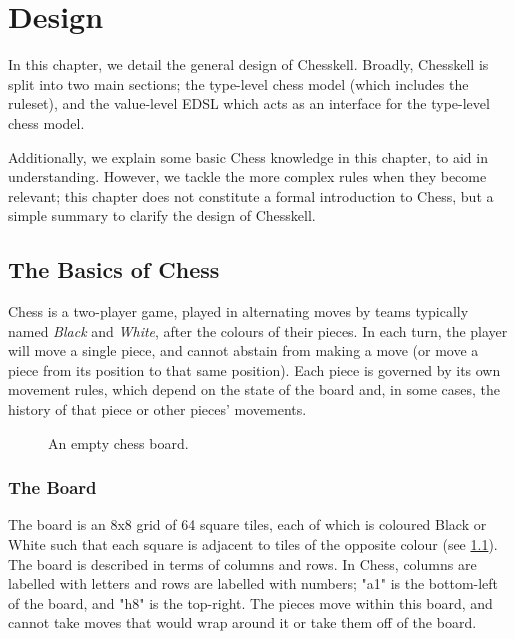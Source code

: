 \chapter{Design}

In this chapter, we detail the general design of Chesskell. Broadly, Chesskell is split into two main sections; the type-level chess model (which includes the ruleset), and the value-level EDSL which acts as an interface for the type-level chess model.

Additionally, we explain some basic Chess knowledge in this chapter, to aid in understanding. However, we tackle the more complex rules when they become relevant; this chapter does not constitute a formal introduction to Chess, but a simple summary to clarify the design of Chesskell.

\section{The Basics of Chess}

Chess is a two-player game, played in alternating moves by teams typically named \emph{Black} and \emph{White}, after the colours of their pieces. In each turn, the player will move a single piece, and cannot abstain from making a move (or move a piece from its position to that same position). Each piece is governed by its own movement rules, which depend on the state of the board and, in some cases, the history of that piece or other pieces' movements.

\begin{figure}[h]
    \centering
    \showboard
    \caption{An empty chess board.}
    \label{chessboard}
\end{figure}

\subsection{The Board} \label{boarddetails}

The board is an 8x8 grid of 64 square tiles, each of which is coloured Black or White such that each square is adjacent to tiles of the opposite colour (see \cref{chessboard}). The board is described in terms of columns and rows. In Chess, columns are labelled with letters and rows are labelled with numbers; "a1" is the bottom-left of the board, and "h8" is the top-right. The pieces move within this board, and cannot take moves that would wrap around it or take them off of the board.

